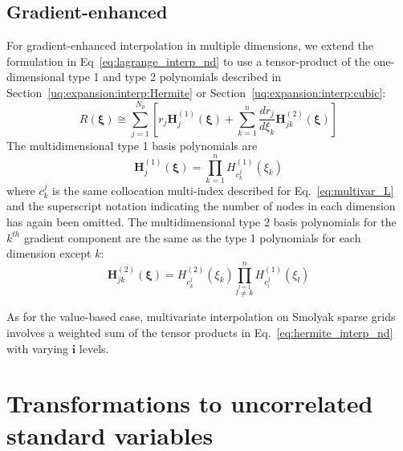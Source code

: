 
\subsection{Gradient-enhanced} \label{uq:expansion:sc:gradient}

For gradient-enhanced interpolation in multiple dimensions, we extend
the formulation in Eq~\ref{eq:lagrange_interp_nd} to use a
tensor-product of the one-dimensional type 1 and type 2 polynomials
described in Section~\ref{uq:expansion:interp:Hermite} or
Section~\ref{uq:expansion:interp:cubic}:
\begin{equation}
R(\boldsymbol{\xi}) \cong \sum_{j=1}^{N_p} \left[ 
r_j \boldsymbol{H}_j^{(1)}(\boldsymbol{\xi}) + 
\sum_{k=1}^n \frac{dr_j}{d\xi_k} \boldsymbol{H}_{jk}^{(2)}(\boldsymbol{\xi}) 
\right] \label{eq:hermite_interp_nd}
\end{equation}
The multidimensional type 1 basis polynomials are
\begin{equation}
\boldsymbol{H}_j^{(1)}(\boldsymbol{\xi}) =
\prod_{k=1}^{n} H^{(1)}_{c^j_k}(\xi_k) \label{eq:multivar_H1}
\end{equation}
where $c_k^j$ is the same collocation multi-index described for
Eq.~\ref{eq:multivar_L} and the superscript notation indicating the
number of nodes in each dimension has again been omitted.  The
multidimensional type 2 basis polynomials for the $k^{th}$ gradient
component are the same as the type 1 polynomials for each dimension
except $k$:
\begin{equation}
\boldsymbol{H}_{jk}^{(2)}(\boldsymbol{\xi}) = H^{(2)}_{c^j_k}(\xi_k)
\prod_{\stackrel{\scriptstyle l=1}{l \ne k}}^{n} H^{(1)}_{c^j_l}(\xi_l) 
\label{eq:multivar_H2}
\end{equation}

As for the value-based case, multivariate interpolation on Smolyak
sparse grids involves a weighted sum of the tensor products in
Eq.~\ref{eq:hermite_interp_nd} with varying $\boldsymbol{i}$ levels.


\section{Transformations to uncorrelated standard variables} \label{uq:expansion:trans}


